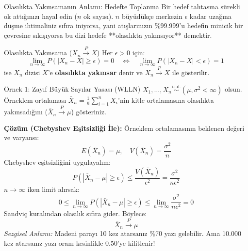 \documentclass[12pt,a4paper]{article}
\begin{document}
\begin{sezgi}{Olasılıkta Yakınsamanın Anlamı: Hedefte Toplanma}
Bir hedef tahtasına sürekli ok attığınızı hayal edin ($n$ ok sayısı). $n$ büyüdükçe merkezin $\epsilon$ kadar uzağına düşme ihtimaliniz sıfıra iniyorsa, yani atışlarınızın \%99.999'u hedefin minicik bir çevresine sıkışıyorsa bu dizi hedefe **olasılıkta yakınsıyor** demektir.
\end{sezgi}

\begin{tanim}{Olasılıkta Yakınsama ($X_n \xrightarrow{P} X$)}
Her $\epsilon > 0$ için:
\begin{equation}
    \lim_{n \to \infty} P\left( |X_n - X| \ge \epsilon \right) = 0 \quad \iff \quad \lim_{n \to \infty} P\left( |X_n - X| < \epsilon \right) = 1
\end{equation}
ise $X_n$ dizisi $X$'e \textbf{olasılıkta yakınsar} denir ve $X_n \xrightarrow{P} X$ ile gösterilir.
\end{tanim}

\begin{ornek}{Örnek 1: Zayıf Büyük Sayılar Yasası (WLLN)}
$X_1, \dots, X_n \overset{\text{i.i.d.}}{\sim} (\mu, \sigma^2 < \infty)$ olsun. Örneklem ortalaması $\bar{X}_n = \frac{1}{n} \sum_{i=1}^n X_i$'nin kitle ortalamasına olasılıkta yakınsadığını ($\bar{X}_n \xrightarrow{P} \mu$) gösteriniz.

\bigskip
\textbf{Çözüm (Chebyshev Eşitsizliği İle):}
Örneklem ortalamasının beklenen değeri ve varyansı:
\begin{equation}
    E(\bar{X}_n) = \mu, \quad V(\bar{X}_n) = \frac{\sigma^2}{n}
\end{equation}
Chebyshev eşitsizliğini uygulayalım:
\begin{equation}
    P\left( |\bar{X}_n - \mu| \ge \epsilon \right) \le \frac{V(\bar{X}_n)}{\epsilon^2} = \frac{\sigma^2}{n \epsilon^2}
\end{equation}
$n \to \infty$ iken limit alırsak:
\begin{equation}
    0 \le \lim_{n \to \infty} P\left( |\bar{X}_n - \mu| \ge \epsilon \right) \le \lim_{n \to \infty} \frac{\sigma^2}{n \epsilon^2} = 0
\end{equation}
Sandviç kuralından olasılık sıfıra gider. Böylece:
\begin{equation}
    \boxed{\bar{X}_n \xrightarrow{P} \mu}
\end{equation}
\textit{Sezgisel Anlamı:} Madeni parayı 10 kez atarsanız \%70 yazı gelebilir. Ama 10.000 kez atarsanız yazı oranı kesinlikle 0.50'ye kilitlenir!
\end{ornek}
\end{document}
